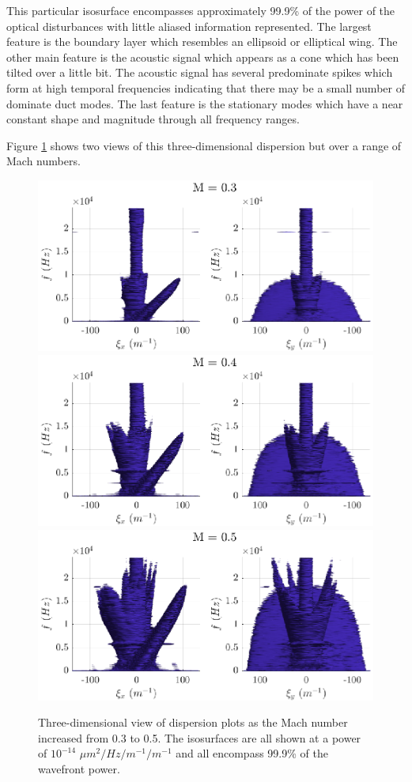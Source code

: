This particular isosurface encompasses approximately 99.9\% of the power of the optical disturbances with little aliased information represented.
The largest feature is the boundary layer which resembles an ellipsoid or elliptical wing.
The other main feature is the acoustic signal which appears as a cone which has been tilted over a little bit.
The acoustic signal has several predominate spikes which form at high temporal frequencies indicating that there may be a small number of dominate duct modes.
The last feature is the stationary modes which have a near constant shape and magnitude through all frequency ranges.

Figure \ref{fig:04_dispersion_mach} shows two views of this three-dimensional dispersion but over a range of Mach numbers.
\begin{figure}
  \centering
  \includegraphics{../matlab/04_dispersion_analysis/dispersion_mach_0.3.eps}
  \includegraphics{../matlab/04_dispersion_analysis/dispersion_mach_0.4.eps}
  \includegraphics{../matlab/04_dispersion_analysis/dispersion_mach_0.5.eps}
  \caption{Three-dimensional view of dispersion plots as the Mach number increased from 0.3 to 0.5. The isosurfaces are all shown at a power of $10^{-14}$ $\mu m^2/Hz/m^{-1}/m^{-1}$ and all encompass 99.9\% of the wavefront power.}
  \label{fig:04_dispersion_mach}
\end{figure}
